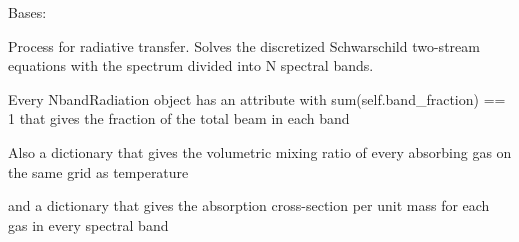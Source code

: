 \documentclass[letterpaper,10pt,english]{sphinxmanual}
\begin{document}

\begin{fulllineitems}
\label{api/climlab.radiation:climlab.radiation.nband.NbandRadiation}
Bases: 

Process for radiative transfer.
Solves the discretized Schwarschild two-stream equations
with the spectrum divided into N spectral bands.

Every NbandRadiation object has an attribute
with sum(self.band\_fraction) == 1
that gives the fraction of the total beam in each band

Also a dictionary
that gives the volumetric mixing ratio of every absorbing gas
on the same grid as temperature

and a dictionary
that gives the absorption cross-section per unit mass for each gas
in every spectral band

\begin{fulllineitems}
\label{api/climlab.radiation:climlab.radiation.nband.NbandRadiation.band_fraction}
\end{fulllineitems}


\end{fulllineitems}

\end{document}
